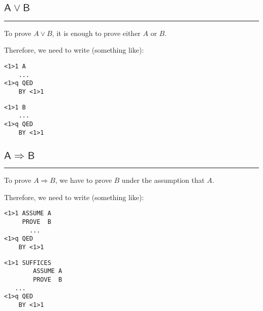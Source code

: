 \documentclass{article}
\newcommand{\code}[1]{\mathsf{#1}}
\begin{document}
\subsection{$\code{A \vee B}$}
\hrule
\vspace{10pt}
\begin{minipage}{230pt}
To prove $A \vee B$, it is enough to prove either $A$ or $B$. \\

\vspace{5pt}

Therefore, we need to write (something like):
\end{minipage}
%
\hspace{15pt} \vline \hspace{15pt}
%
\begin{minipage}{80pt}
\begin{verbatim}
<1>1 A
    ...
<1>q QED
    BY <1>1
\end{verbatim}
\end{minipage}
\hspace{5pt} \vline \hspace{25pt}
\begin{minipage}{80pt}
\begin{verbatim}
<1>1 B
    ...
<1>q QED
    BY <1>1
\end{verbatim}
\end{minipage}

\subsection{$\code{A \Rightarrow B}$}
\hrule
\vspace{10pt}
\begin{minipage}{230pt}
To prove $A \Rightarrow B$, we have to prove $B$ under the assumption that $A$. \\

\vspace{5pt}

Therefore, we need to write (something like):
\vspace{10pt}
\end{minipage}
%
\hspace{15pt} \vline \hspace{15pt}
%
\begin{minipage}{80pt}
\begin{verbatim}
<1>1 ASSUME A
     PROVE  B
       ...
<1>q QED
    BY <1>1
\end{verbatim}
\vspace{1pt}
\end{minipage}
\hspace{5pt} \vline \hspace{15pt}
\begin{minipage}{80pt}
\begin{verbatim}
<1>1 SUFFICES
        ASSUME A
        PROVE  B
   ...
<1>q QED
    BY <1>1
\end{verbatim}
\end{minipage}
\end{document}
